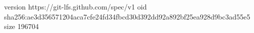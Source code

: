 version https://git-lfs.github.com/spec/v1
oid sha256:ae3d356571204aca7cfe24fd34fbcd30d392dd92a892bf25ea928d9bc3ad55e5
size 196704
